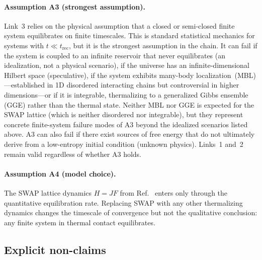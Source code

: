 \paragraph{Assumption A3 (strongest assumption).}
Link~3 relies on the physical assumption that a closed or
semi-closed finite system equilibrates on finite timescales.  This
is standard statistical mechanics for systems with
$t \ll t_{\mathrm{rec}}$, but it is the strongest assumption in the
chain.  It can fail if the system is coupled to an infinite reservoir
that never equilibrates (an idealization, not a physical scenario),
if the universe has an infinite-dimensional Hilbert space
(speculative), if the system exhibits many-body
localization~(MBL)---established in 1D disordered interacting
chains but controversial in higher dimensions---or if it is
integrable, thermalizing to a generalized Gibbs ensemble (GGE)
rather than the thermal state.  Neither MBL nor GGE is expected
for the SWAP lattice (which is neither disordered nor integrable),
but they represent concrete finite-system failure modes of A3
beyond the idealized scenarios listed above.  A3 can also fail
if there exist sources of free energy that do not ultimately
derive from a low-entropy initial condition (unknown physics).
Links~1 and~2 remain valid regardless of whether A3 holds.

\paragraph{Assumption A4 (model choice).}
The SWAP lattice dynamics $H = JF$ from Ref.~\cite{Paper6} enters
only through the quantitative equilibration rate.  Replacing SWAP
with any other thermalizing dynamics changes the timescale of
convergence but not the qualitative conclusion: any finite system
in thermal contact equilibrates.

\subsection{Explicit non-claims}\label{sec:nonclaims}

